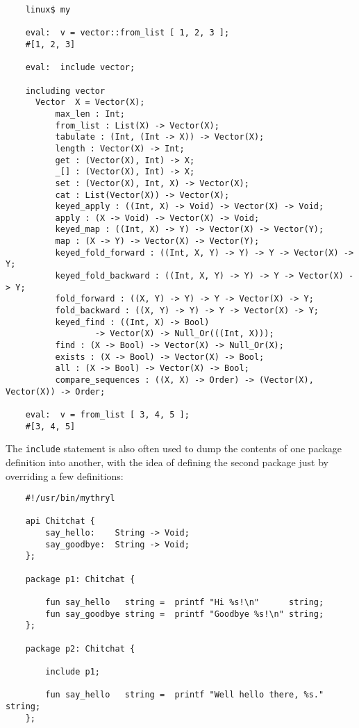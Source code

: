 \begin{verbatim}
    linux$ my

    eval:  v = vector::from_list [ 1, 2, 3 ];
    #[1, 2, 3]

    eval:  include vector;

    including vector
      Vector  X = Vector(X);
          max_len : Int;
          from_list : List(X) -> Vector(X);
          tabulate : (Int, (Int -> X)) -> Vector(X);
          length : Vector(X) -> Int;
          get : (Vector(X), Int) -> X;
          _[] : (Vector(X), Int) -> X;
          set : (Vector(X), Int, X) -> Vector(X);
          cat : List(Vector(X)) -> Vector(X);
          keyed_apply : ((Int, X) -> Void) -> Vector(X) -> Void;
          apply : (X -> Void) -> Vector(X) -> Void;
          keyed_map : ((Int, X) -> Y) -> Vector(X) -> Vector(Y);
          map : (X -> Y) -> Vector(X) -> Vector(Y);
          keyed_fold_forward : ((Int, X, Y) -> Y) -> Y -> Vector(X) -> Y;
          keyed_fold_backward : ((Int, X, Y) -> Y) -> Y -> Vector(X) -> Y;
          fold_forward : ((X, Y) -> Y) -> Y -> Vector(X) -> Y;
          fold_backward : ((X, Y) -> Y) -> Y -> Vector(X) -> Y;
          keyed_find : ((Int, X) -> Bool)
                  -> Vector(X) -> Null_Or(((Int, X)));
          find : (X -> Bool) -> Vector(X) -> Null_Or(X);
          exists : (X -> Bool) -> Vector(X) -> Bool;
          all : (X -> Bool) -> Vector(X) -> Bool;
          compare_sequences : ((X, X) -> Order) -> (Vector(X), Vector(X)) -> Order;

    eval:  v = from_list [ 3, 4, 5 ];
    #[3, 4, 5]
\end{verbatim}

The {\tt include} statement is also often used to dump the contents of 
one package definition into another, with the idea of defining the second 
package just by overriding a few definitions:

\begin{verbatim}
    #!/usr/bin/mythryl

    api Chitchat {
        say_hello:    String -> Void;
        say_goodbye:  String -> Void;
    };

    package p1: Chitchat {

        fun say_hello   string =  printf "Hi %s!\n"      string;
        fun say_goodbye string =  printf "Goodbye %s!\n" string;
    };

    package p2: Chitchat {

        include p1;

        fun say_hello   string =  printf "Well hello there, %s."  string;
    };
\end{verbatim}

